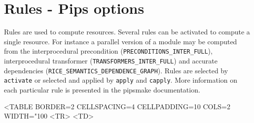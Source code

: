 \documentclass[a4paper,12pt]{article}
\begin{document}
\section{Rules - Pips options}
\label{rules}
Rules are used to compute resources. Several rules can be activated to
compute a single resource. For instance a parallel version of a module may
be computed from the interprocedural precondition
(\verb+PRECONDITIONS_INTER_FULL+), interprocedural transformer
(\verb+TRANSFORMERS_INTER_FULL+) and accurate
dependencies (\verb+RICE_SEMANTICS_DEPENDENCE_GRAPH+). Rules are selected
by \verb+activate+ or selected and applied by \verb+apply+ and \verb+capply+.
More information on each particular rule is presented  in the pipsmake documentation.
\begin{rawhtml}
<TABLE BORDER=2 CELLSPACING=4 CELLPADDING=10 COLS=2 WIDTH="100%
<TR>
<TD>
\end{rawhtml}
\end{document}
